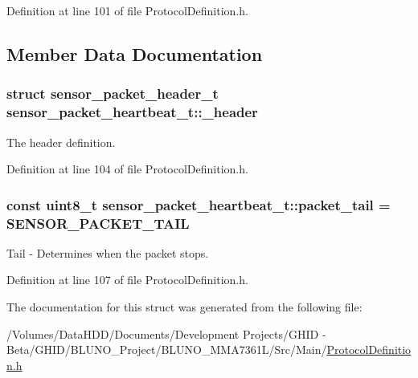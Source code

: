 \-Definition at line 101 of file \-Protocol\-Definition.\-h.



\subsection{\-Member \-Data \-Documentation}
\hypertarget{structsensor__packet__heartbeat__t_a385dff0d2b057f0b15a127253dd9cfd3}{
\subsubsection[{\-\_\-header}]{\setlength{\rightskip}{0pt plus 5cm}struct {\bf sensor\-\_\-packet\-\_\-header\-\_\-t} {\bf sensor\-\_\-packet\-\_\-heartbeat\-\_\-t\-::\-\_\-header}}}\label{structsensor__packet__heartbeat__t_a385dff0d2b057f0b15a127253dd9cfd3}


\-The header definition. 



\-Definition at line 104 of file \-Protocol\-Definition.\-h.

\hypertarget{structsensor__packet__heartbeat__t_afc573667875c2ca9d9a81dbcc0e53052}{
\subsubsection[{packet\-\_\-tail}]{\setlength{\rightskip}{0pt plus 5cm}const uint8\-\_\-t {\bf sensor\-\_\-packet\-\_\-heartbeat\-\_\-t\-::packet\-\_\-tail} = {\bf \-S\-E\-N\-S\-O\-R\-\_\-\-P\-A\-C\-K\-E\-T\-\_\-\-T\-A\-I\-L}}}\label{structsensor__packet__heartbeat__t_afc573667875c2ca9d9a81dbcc0e53052}


\-Tail -\/ \-Determines when the packet stops. 



\-Definition at line 107 of file \-Protocol\-Definition.\-h.



\-The documentation for this struct was generated from the following file\-:\begin{DoxyCompactItemize}
\item 
/\-Volumes/\-Data\-H\-D\-D/\-Documents/\-Development Projects/\-G\-H\-I\-D -\/ Beta/\-G\-H\-I\-D/\-B\-L\-U\-N\-O\-\_\-\-Project/\-B\-L\-U\-N\-O\-\_\-\-M\-M\-A7361\-L/\-Src/\-Main/\hyperlink{_protocol_definition_8h}{\-Protocol\-Definition.\-h}\end{DoxyCompactItemize}
